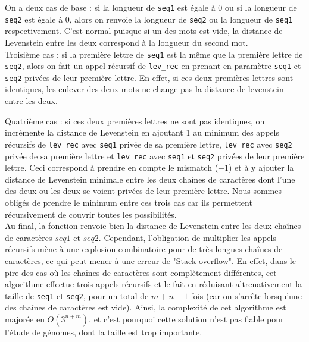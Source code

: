 \documentclass[12pt]{article}
\begin{document}
On a deux cas de base : si la longueur de \texttt{seq1} est égale à $0$ ou si la longueur de \texttt{seq2} est égale à $0$, alors on renvoie la longueur de \texttt{seq2} ou la longueur de \texttt{seq1} respectivement. C'est normal puisque si un des mots est vide, la distance de Levenstein entre les deux correspond à la longueur du second mot.\\

Troisième cas : si la première lettre de \texttt{seq1} est la même que la première lettre de \texttt{seq2}, alors on fait un appel récursif de \texttt{lev\_rec} en prenant en paramètre \texttt{seq1} et \texttt{seq2} privées de leur première lettre. En effet, si ces deux premières lettres sont identiques, les enlever des deux mots ne change pas la distance de levenstein entre les deux.\\

\newpage

Quatrième cas : si ces deux premières lettres ne sont pas identiques, on incrémente la distance de Levenstein en ajoutant 1 au minimum des appels récursifs de \texttt{lev\_rec} avec \texttt{seq1} privée de sa première lettre, \texttt{lev\_rec} avec \texttt{seq2} privée de sa première lettre et \texttt{lev\_rec} avec \texttt{seq1} et \texttt{seq2} privées de leur première lettre. Ceci correspond à prendre en compte le mismatch ($+1$) et à y ajouter la distance de Levenstein minimale entre les deux chaînes de caractères dont l'une des deux ou les deux se voient privées de leur première lettre. Nous sommes obligés de prendre le minimum entre ces trois cas car ils permettent récursivement de couvrir toutes les possibilités.\\

Au final, la fonction renvoie bien la distance de Levenstein entre les deux chaînes de caractères $seq1$ et $seq2$. Cependant, l'obligation de multiplier les appels récursifs mène à une explosion combinatoire pour de très longues chaînes de caractères, ce qui peut mener à une erreur de "Stack overflow". En effet, dans le pire des cas où les chaînes de caractères sont complètement différentes, cet algorithme effectue trois appels récursifs et le fait en réduisant altrenativement la taille de \texttt{seq1} et \texttt{seq2}, pour un total de $m+n-1$ fois (car on s'arrête lorsqu'une des chaînes de caractères est vide). Ainsi, la complexité de cet algorithme est majorée en $O(3^{n+m})$, et c'est pourquoi cette solution n'est pas fiable pour l'étude de génomes, dont la taille est trop importante.
\end{document}
